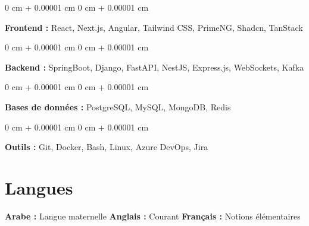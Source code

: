 \documentclass[10pt, letterpaper]{article}
\newenvironment{onecolentry}{
    \begin{adjustwidth}{
        0 cm + 0.00001 cm
    }{
        0 cm + 0.00001 cm
    }
}{
    \end{adjustwidth}
} %
\begin{document}
        \begin{onecolentry}
            \textbf{Frontend :} React, Next.js, Angular, Tailwind CSS, PrimeNG, Shadcn, TanStack
        \end{onecolentry}
        \vspace{0.2 cm}
        
        \begin{onecolentry}
            \textbf{Backend :} SpringBoot, Django, FastAPI, NestJS, Express.js, WebSockets, Kafka
        \end{onecolentry}
        \vspace{0.2 cm}
        
        \begin{onecolentry}
            \textbf{Bases de données :} PostgreSQL, MySQL, MongoDB, Redis
        \end{onecolentry}
        \vspace{0.2 cm}
        
        \begin{onecolentry}
            \textbf{Outils :} Git, Docker, Bash, Linux, Azure DevOps, Jira
        \end{onecolentry}
        \vspace{0.2 cm}

    \section{Langues}
        \textbf{Arabe :} Langue maternelle
        \hspace{1 cm}
        \textbf{Anglais :} Courant
        \hspace{1 cm}
        \textbf{Français :} Notions élémentaires
\end{document}
